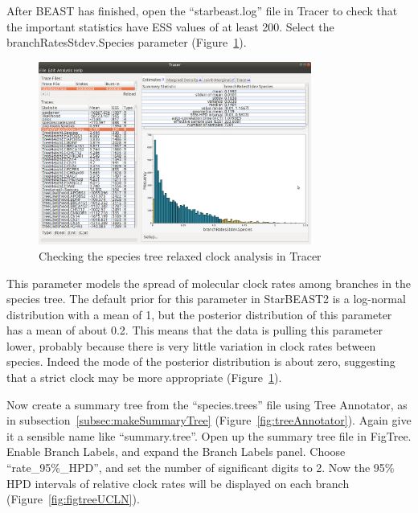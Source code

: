 \documentclass[12pt]{article}
\begin{document}
After BEAST has finished, open the ``starbeast.log'' file in Tracer to
check that the important statistics have ESS values of at least 200.
Select the branchRatesStdev.Species parameter (Figure~\ref{fig:tracerUCLN}).

\begin{figure}[htb!]
\centering
\includegraphics[width=0.8\textwidth]{figures/tracerUCLN.png}
\caption
{Checking the species tree relaxed clock analysis in Tracer}
\label{fig:tracerUCLN}
\end{figure}

This parameter models the spread of molecular clock rates among branches in
the species tree. The default prior for this parameter in StarBEAST2 is a
log-normal distribution with a mean of 1, but the posterior distribution of this
parameter has a mean of about 0.2. This means that the data is pulling this
parameter lower, probably because there is very little variation in clock
rates between species. Indeed the mode of the posterior distribution is about
zero, suggesting that a strict clock may be more appropriate
(Figure~\ref{fig:tracerUCLN}).

Now create a summary tree from the ``species.trees'' file using Tree
Annotator, as in subsection~\ref{subsec:makeSummaryTree}
(Figure~\ref{fig:treeAnnotator}). Again give it a sensible name like
``summary.tree''. Open up the summary tree file in FigTree. Enable Branch Labels,
and expand the Branch Labels panel. Choose ``rate\_95\%\_HPD'', and set
the number of significant digits to 2. Now the 95\% HPD intervals of
relative clock rates will be displayed on each branch
(Figure~\ref{fig:figtreeUCLN}).
\end{document}
